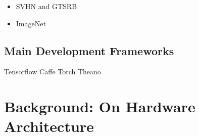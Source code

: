 \begin{itemize}
  \item SVHN and GTSRB



  \item ImageNet


\end{itemize}



\subsection{Main Development Frameworks}

Tensorflow
Caffe
Torch
Theano



\section{Background: On Hardware Architecture}

